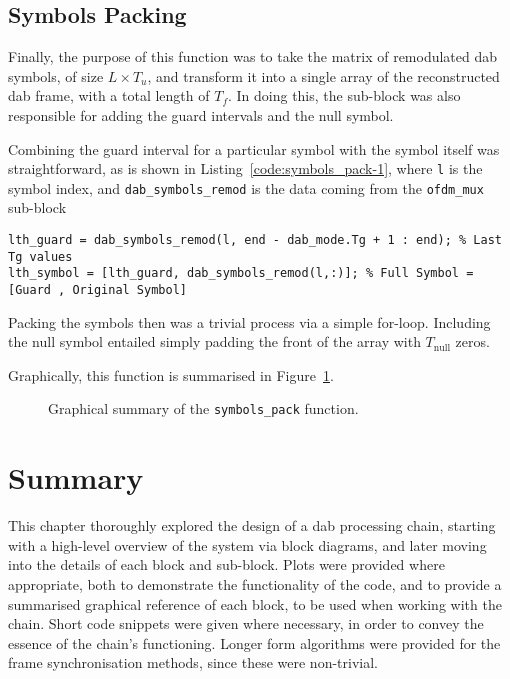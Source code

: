 \documentclass[class=report,11pt,crop=false]{standalone}
\begin{document}
\subsection{Symbols Packing \label{subsect:dab-proc_symbols-pack}}
Finally, the purpose of this function was to take the matrix of remodulated \gls{dab} symbols, of size \(L \times T_u\), and transform it into a single array of the reconstructed \gls{dab} frame, with a total length of \(T_f\). In doing this, the sub-block was also responsible for adding the guard intervals and the null symbol.

Combining the guard interval for a particular symbol with the symbol itself was straightforward, as is shown in Listing~\ref{code:symbols_pack-1}, where \texttt{l} is the symbol index, and \texttt{dab\_symbols\_remod} is the data coming from the \texttt{ofdm\_mux} sub-block

\begin{lstlisting}[caption={\textsc{Matlab} code for prepending a guard interval to a symbol.},label={code:symbols_pack-1}]
lth_guard = dab_symbols_remod(l, end - dab_mode.Tg + 1 : end); % Last Tg values
lth_symbol = [lth_guard, dab_symbols_remod(l,:)]; % Full Symbol = [Guard , Original Symbol]
\end{lstlisting}

Packing the symbols then was a trivial process via a simple for-loop. Including the null symbol entailed simply padding the front of the array with \(T_\mathrm{null}\) zeros.

Graphically, this function is summarised in Figure~\ref{fig:symbols_pack}.

\begin{figure}[htbp]
  \centering
  \captionsetup{type=figure}
  \def\svgwidth{\linewidth}
  { %
  }
  \caption{Graphical summary of the \texttt{symbols\_pack} function.}
  \label{fig:symbols_pack}
\end{figure}

\section{Summary}
This chapter thoroughly explored the design of a \gls{dab} processing chain, starting with a high-level overview of the system via block diagrams, and later moving into the details of each block and sub-block. Plots were provided where appropriate, both to demonstrate the functionality of the code, and to provide a summarised graphical reference of each block, to be used when working with the chain. Short code snippets were given where necessary, in order to convey the essence of the chain's functioning. Longer form algorithms were provided for the frame synchronisation methods, since these were non-trivial.

\ifstandalone

\printnoidxglossary[type=\acronymtype,nonumberlist]
\fi
\end{document}
